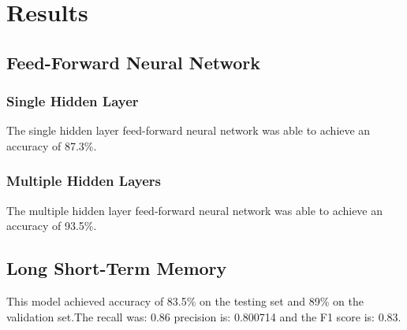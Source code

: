 \section{Results}
\label{sec:results}

\subsection{Feed-Forward Neural Network}

\subsubsection{Single Hidden Layer} The single hidden layer
feed-forward neural network was able to achieve an accuracy of 87.3\%.

\subsubsection{Multiple Hidden Layers} The multiple hidden layer
feed-forward neural network was able to achieve an accuracy of 93.5\%.

\subsection{Long Short-Term Memory}
This model achieved accuracy of 83.5\% on the testing set and 89\% on the validation set.The recall was: 0.86  precision is: 0.800714 and the F1 score is: 0.83. 
